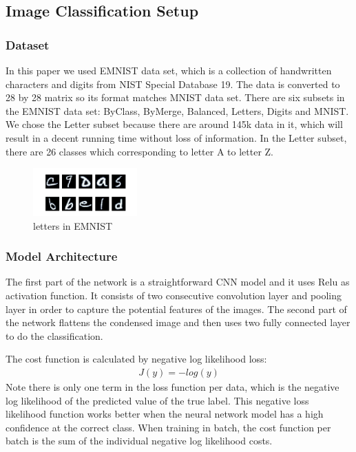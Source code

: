 \subsection{Image Classification Setup}

\subsubsection{Dataset}

In this paper we used EMNIST \cite{emnist} data set, which is a collection of handwritten characters and digits from NIST Special Database 19. The data is converted to 28 by 28 matrix so its format matches MNIST data set. There are six subsets in the EMNIST data set: ByClass, ByMerge, Balanced, Letters, Digits and MNIST. We chose the Letter subset because there are around 145k data in it, which will result in a decent running time without loss of information. In the Letter subset, there are 26 classes which corresponding to letter A to letter Z.
\begin{figure}[htp]
    \centering
    \includegraphics[width=4cm]{img/EMNIST.png}
    \caption{letters in EMNIST}
    \label{fig:EMNIST}
\end{figure}


\subsubsection{Model Architecture}

The first part of the network is a straightforward CNN model and it uses Relu as activation function. It consists of two consecutive convolution layer and pooling layer in order to capture the potential features of the images. The second part of the network flattens the condensed image and then uses two fully connected layer to do the classification.

The cost function is calculated by negative log likelihood loss:
\begin{align*}
    J(y) = -log(y) 
\end{align*}
Note there is only one term in the loss function per data, which is the negative log likelihood of the predicted value of the true label. This negative loss likelihood function works better when the neural network model has a high confidence at the correct class. When training in batch, the cost function per batch is the sum of the individual negative log likelihood costs.

